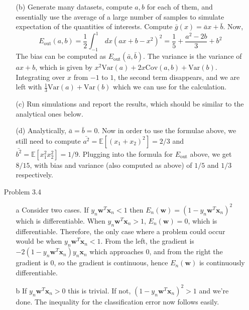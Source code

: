 \documentclass[10pt]{article}
\begin{document}
\begin{enumerate}
\begin{itemize}
        \item[(b)] Generate many datasets, compute $a, b$ for
        each of them, and essentially use the average of a large number of samples to simulate expectation of the quantities of interests.
        Compute $\bar{g} (x) = \bar{a} x +
        \bar{b}$. Now,
        \[ E_{\text{out}} (a, b) = \frac{1}{2} \int_{-1}^{1} \,dx (ax
        + b - x^2)^2 = \frac{1}{5} + \frac{a^2 - 2b}{3} + b^2 \]
        The bias can be computed as $E_{\text{out}} (\bar{a},
        \bar{b})$. The variance is the variance of $ax+b$, which is
        given by $x^2 \text{Var} (a) + 2x \text{Cov}(a,b) + \text{Var}
        (b)$. Integrating over $x$ from $-1$ to $1$, the second term
        disappears, and we are left with $\frac{1}{3} \text{Var} (a) + \text{Var}
        (b)$ which we can use for the calculation.

        \item[(c)] Run simulations and report the results, which
          should be similar to the analytical ones below.

        \item[(d)] Analytically, $\bar{a} = \bar{b} = 0$. Now in order
          to use the formulae above, we still need to compute
          $\bar{a^2} = \mathbb{E} [(x_1 + x_2)^2] = 2/3$ and
          $\bar{b^2} =\mathbb{E} [x_1^2 x_2^2] = 1/9$. Plugging into
          the formula for $E_{\text{out}}$ above, we get $8/15$, with bias
          and variance (also computed as above) of $1/5$ and $1/3$
          respectively. 

        \end{itemize} 


\item[Problem 3.4]
\begin{itemize}
  \item[a] Consider two cases. If $y_n \mathbf{w}^T \mathbf{x}_n < 1$
    then $E_{n} (\mathbf{w}) = (1 - y_n \mathbf{w}^T \mathbf{x}_n)^2$
    which is differentiable. When $y_n \mathbf{w}^T \mathbf{x}_n > 1$,
    $E_{n} (\mathbf{w}) = 0$, which is differentiable. Therefore, the
    only case where a problem could occur would be when $y_n
    \mathbf{w}^T \mathbf{x}_n < 1$. From the left, the gradient is
    $-2(1 - y_n \mathbf{w}^T \mathbf{x}_n) y_n \mathbf{x}_n$ which
    approaches 0, and from the right the gradient is 0, so the
    gradient is continuous, hence $E_n (\mathbf{w})$ is continuously
    differentiable.
    
  \item[b] If $y_n \mathbf{w}^T \mathbf{x}_n > 0$ this is trivial. If
    not, $(1 - y_n \mathbf{w}^T \mathbf{x}_n)^2 > 1$ and we're
    done. The inequality for the classification error now follows
    easily.


\end{itemize}
\end{enumerate}
\end{document}
